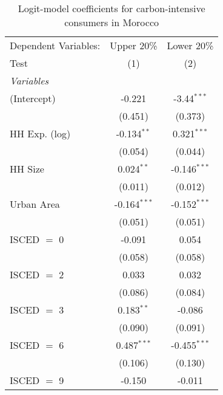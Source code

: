 
\begin{table}[htbp!]
   \centering
   \small
   \begin{adjustbox}{width = 1\textwidth, max height = 0.95\textheight, center}
      \begin{threeparttable}[b]
         \caption{\label{tab:Logit_1_MAR} Logit-model coefficients for carbon-intensive consumers in Morocco}
         \begin{tabular}{lcc}
            \tabularnewline \midrule \midrule
            Dependent Variables: & Upper 20\%     & Lower 20\%\\   
            Test                 & (1)            & (2)\\  
            \midrule
            \emph{Variables}\\
            (Intercept)          & -0.221         & -3.44$^{***}$\\   
                                 & (0.451)        & (0.373)\\   
            HH Exp. (log)        & -0.134$^{**}$  & 0.321$^{***}$\\   
                                 & (0.054)        & (0.044)\\   
            HH Size              & 0.024$^{**}$   & -0.146$^{***}$\\   
                                 & (0.011)        & (0.012)\\   
            Urban Area           & -0.164$^{***}$ & -0.152$^{***}$\\   
                                 & (0.051)        & (0.051)\\   
            ISCED $=$ 0          & -0.091         & 0.054\\   
                                 & (0.058)        & (0.058)\\   
            ISCED $=$ 2          & 0.033          & 0.032\\   
                                 & (0.086)        & (0.084)\\   
            ISCED $=$ 3          & 0.183$^{**}$   & -0.086\\   
                                 & (0.090)        & (0.091)\\   
            ISCED $=$ 6          & 0.487$^{***}$  & -0.455$^{***}$\\   
                                 & (0.106)        & (0.130)\\   
            ISCED $=$ 9          & -0.150         & -0.011\\   

\end{tabular}
\end{threeparttable}
\end{adjustbox}
\end{table}
